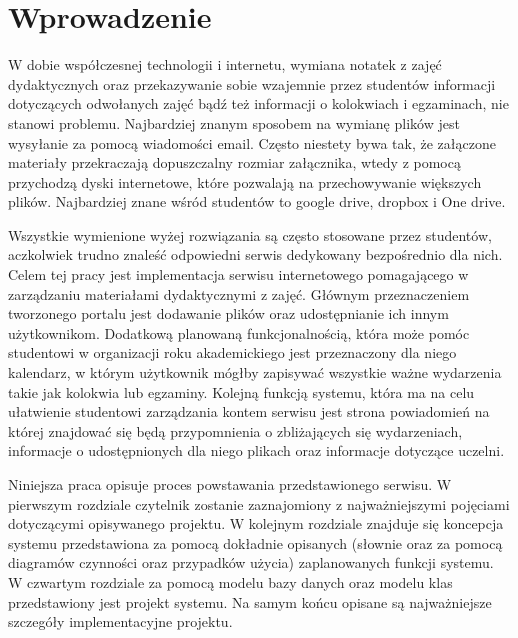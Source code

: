\chapter{Wprowadzenie}
\label{cha:wprowadzenie}

W dobie współczesnej technologii i internetu, wymiana notatek z zajęć dydaktycznych oraz przekazywanie sobie wzajemnie przez studentów informacji dotyczących odwołanych zajęć bądź też informacji o kolokwiach i egzaminach, nie stanowi problemu. Najbardziej znanym sposobem na wymianę plików jest wysyłanie za pomocą wiadomości email. Często niestety bywa tak, że załączone materiały przekraczają dopuszczalny rozmiar załącznika, wtedy z pomocą przychodzą dyski internetowe, które pozwalają na przechowywanie większych plików. Najbardziej znane wśród studentów to google drive, dropbox i One drive.

Wszystkie wymienione wyżej rozwiązania są często stosowane przez studentów, aczkolwiek trudno znaleść odpowiedni serwis dedykowany bezpośrednio dla nich. Celem tej pracy jest implementacja serwisu internetowego pomagającego w zarządzaniu materiałami dydaktycznymi z zajęć. Głównym przeznaczeniem tworzonego portalu jest dodawanie plików oraz udostępnianie ich innym użytkownikom. Dodatkową planowaną  funkcjonalnością, która może pomóc studentowi w organizacji roku akademickiego jest przeznaczony dla niego kalendarz, w którym użytkownik mógłby zapisywać wszystkie ważne wydarzenia takie jak kolokwia lub egzaminy. Kolejną funkcją systemu, która ma na celu ułatwienie studentowi zarządzania kontem serwisu jest strona powiadomień na której znajdować się będą przypomnienia o zbliżających się wydarzeniach, informacje o udostępnionych dla niego plikach oraz informacje dotyczące uczelni.

Niniejsza praca opisuje proces powstawania przedstawionego serwisu. W pierwszym rozdziale czytelnik zostanie zaznajomiony z najważniejszymi pojęciami dotyczącymi opisywanego projektu. W kolejnym rozdziale znajduje się koncepcja systemu przedstawiona za pomocą dokładnie opisanych (słownie oraz za pomocą diagramów czynności oraz przypadków użycia) zaplanowanych funkcji systemu. W czwartym rozdziale za pomocą modelu bazy danych oraz modelu klas przedstawiony jest projekt systemu. Na samym końcu opisane są najważniejsze szczegóły implementacyjne projektu.